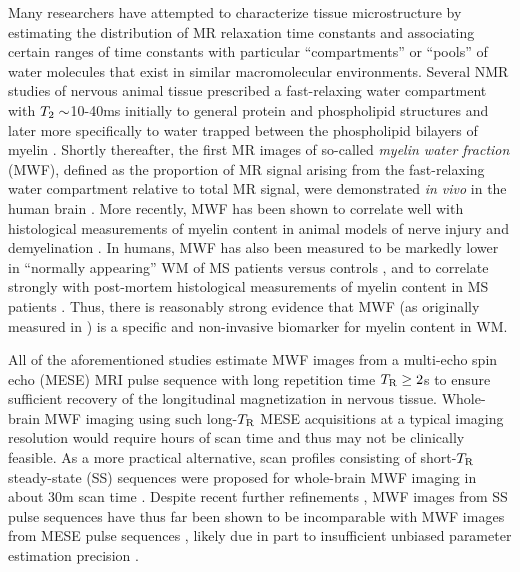 Many researchers have attempted 
to characterize tissue microstructure
by estimating the distribution
of MR relaxation time constants
and associating certain ranges of time constants
with particular ``compartments'' or ``pools'' of water molecules
that exist in similar macromolecular environments.
Several \invitro NMR studies
of nervous animal tissue
prescribed a fast-relaxing water compartment
with $T_2\sim$10-40ms 
initially to general protein 
and phospholipid structures \cite{vasilescu:78:wci}
and later more specifically
to water trapped between
the phospholipid bilayers 
of myelin
\cite{menon:91:aoc, stewart:93:ssr}.
Shortly thereafter,
the first MR images 
of so-called \emph{myelin water fraction} (MWF),
defined as the proportion of MR signal 
arising from the fast-relaxing water compartment
relative to total MR signal,
were demonstrated \emph{in vivo}
in the human brain \cite{mackay:94:ivv}.
More recently,
MWF has been shown 
to correlate well 
with histological measurements
of myelin content 
in animal models
of nerve injury \cite{gareau:00:mta}
and demyelination \cite{webb:03:imt}.
In humans, 
MWF has also been measured 
to be markedly lower
in ``normally appearing'' WM 
of MS patients versus controls \cite{laule:04:wca},
and to correlate strongly 
with post-mortem histological measurements
of myelin content
in MS patients \cite{laule:06:mwi}.
Thus,
there is reasonably strong evidence
that MWF
(as originally measured in \cite{mackay:94:ivv})
is a specific and non-invasive biomarker
for myelin content in WM.

All of the aforementioned studies
estimate MWF images
from a multi-echo spin echo (MESE) MRI pulse sequence
\cite{carr:54:eod}
with long repetition time $T_\mathrm{R}\geq2$s
to ensure sufficient recovery
of the longitudinal magnetization 
in nervous tissue.
Whole-brain MWF imaging 
using such long-$T_\mathrm{R}$ MESE acquisitions
at a typical imaging resolution
would require hours of scan time
and thus may not be clinically feasible.
As a more practical alternative,
scan profiles consisting of short-$T_\mathrm{R}$ steady-state (SS) sequences
were proposed 
for whole-brain MWF imaging in about 30m scan time
\cite{deoni:08:gmt}.
Despite recent further refinements
\cite{deoni:11:com, deoni:13:oct},
MWF images from SS pulse sequences 
have thus far been shown
to be incomparable with MWF images
from MESE pulse sequences
\cite{zhang:15:com},
likely due in part
to insufficient unbiased parameter estimation precision
\cite{lankford:13:oti}.

